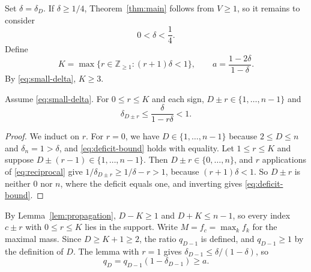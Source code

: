 \documentclass[ECP,preprint]{ejpecp}
\begin{document}
Set $\delta=\delta_D$. If $\delta\geq1/4$,
Theorem~\ref{thm:main} follows from $V\geq1$, so it remains to consider
\begin{equation}\label{eq:small-delta}
  0<\delta<\frac14.
\end{equation}
Define
\begin{equation}\label{eq:K-a}
  K=\max\{r\in\mathbb Z_{\geq1}:(r+1)\delta<1\},
  \qquad
  a=\frac{1-2\delta}{1-\delta}.
\end{equation}
By \eqref{eq:small-delta}, $K\geq3$.

\begin{lemma}\label{lem:propagation}
  Assume \eqref{eq:small-delta}. For $0\leq r\leq K$ and each sign,
  $D\pm r\in\{1,\ldots,n-1\}$ and
  \begin{equation}\label{eq:deficit-bound}
    \delta_{D\pm r}\leq\frac{\delta}{1-r\delta}<1.
  \end{equation}
\end{lemma}

\begin{proof}
  We induct on $r$. For $r=0$, we have $D\in\{1,\ldots,n-1\}$ because
  $2\leq D\leq n$ and $\delta_n=1>\delta$, and \eqref{eq:deficit-bound} holds
  with equality. Let $1\leq r\leq K$ and suppose
  $D\pm(r-1)\in\{1,\ldots,n-1\}$. Then $D\pm r\in\{0,\ldots,n\}$, and $r$
  applications of \eqref{eq:reciprocal} give $1/\delta_{D\pm r}\geq1/\delta-r>1$,
  because $(r+1)\delta<1$. So $D\pm r$ is neither $0$ nor $n$, where the
  deficit equals one, and inverting gives \eqref{eq:deficit-bound}.
\end{proof}

By Lemma~\ref{lem:propagation}, $D-K\geq1$ and $D+K\leq n-1$, so every index
$c\pm r$ with $0\leq r\leq K$ lies in the support. Write $M=f_c=\max_k f_k$
for the maximal mass. Since $D\geq K+1\geq2$, the ratio $q_{D-1}$ is
defined, and $q_{D-1}\geq1$ by the definition of $D$.
The lemma with $r=1$ gives $\delta_{D-1}\leq\delta/(1-\delta)$, so
\[
  q_D=q_{D-1}(1-\delta_{D-1})\geq a.
\]
\end{document}
